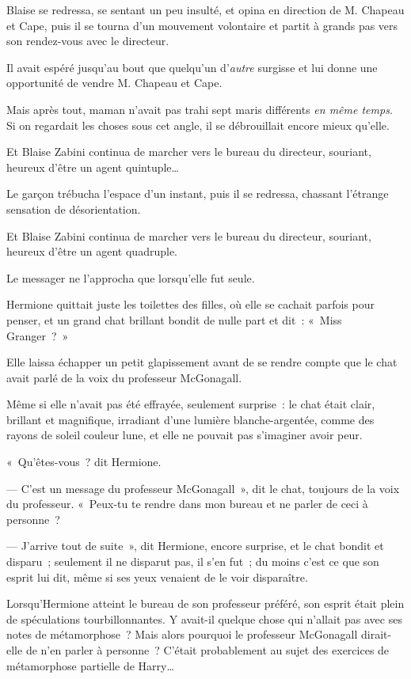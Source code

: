 Blaise se redressa, se sentant un peu insulté, et opina en direction de M. Chapeau et Cape, puis il se tourna d'un mouvement volontaire et partit à grands pas vers son rendez-vous avec le directeur.

Il avait espéré jusqu'au bout que quelqu'un d'\emph{autre} surgisse et lui donne une opportunité de vendre M. Chapeau et Cape.

Mais après tout, maman n'avait pas trahi sept maris différents \emph{en même temps}.
Si on regardait les choses sous cet angle, il se débrouillait encore mieux qu'elle.

Et Blaise Zabini continua de marcher vers le bureau du directeur, souriant, heureux d'être un agent quintuple…

Le garçon trébucha l'espace d'un instant, puis il se redressa, chassant l'étrange sensation de désorientation.

Et Blaise Zabini continua de marcher vers le bureau du directeur, souriant, heureux d'être un agent quadruple.


Le messager ne l'approcha que lorsqu'elle fut seule.

Hermione quittait juste les toilettes des filles, où elle se cachait parfois pour penser, et un grand chat brillant bondit de nulle part et dit~: «~Miss Granger~?~»

Elle laissa échapper un petit glapissement avant de se rendre compte que le chat avait parlé de la voix du professeur McGonagall.

Même si elle n'avait pas été effrayée, seulement surprise~: le chat était clair, brillant et magnifique, irradiant d'une lumière blanche-argentée, comme des rayons de soleil couleur lune, et elle ne pouvait pas s'imaginer avoir peur.

«~Qu'êtes-vous~? dit Hermione.

--- C'est un message du professeur McGonagall~», dit le chat, toujours de la voix du professeur.
«~Peux-tu te rendre dans mon bureau et ne parler de ceci à personne~?

--- J'arrive tout de suite~», dit Hermione, encore surprise, et le chat bondit et disparu~; seulement il ne disparut pas, il s'en fut~; du moins c'est ce que son esprit lui dit, même si ses yeux venaient de le voir disparaître.

Lorsqu'Hermione atteint le bureau de son professeur préféré, son esprit était plein de spéculations tourbillonnantes.
Y avait-il quelque chose qui n'allait pas avec ses notes de métamorphose~?
Mais alors pourquoi le professeur McGonagall dirait-elle de n'en parler à personne~?
C'était probablement au sujet des exercices de métamorphose partielle de Harry…

